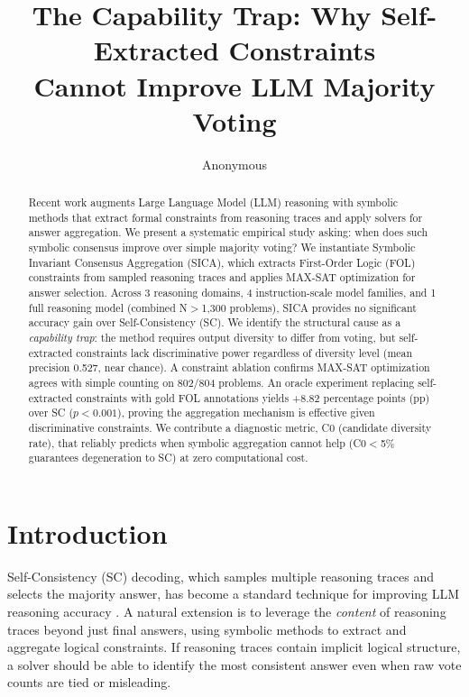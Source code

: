 \documentclass[11pt,a4paper]{article}
\title{The Capability Trap: Why Self-Extracted Constraints\\Cannot Improve LLM Majority Voting}
\author{Anonymous}
\date{}
\begin{document}
\maketitle

\begin{abstract}
Recent work augments Large Language Model (LLM) reasoning with symbolic methods that extract formal constraints from reasoning traces and apply solvers for answer aggregation. We present a systematic empirical study asking: when does such symbolic consensus improve over simple majority voting? We instantiate Symbolic Invariant Consensus Aggregation (SICA), which extracts First-Order Logic (FOL) constraints from sampled reasoning traces and applies MAX-SAT optimization for answer selection. Across 3 reasoning domains, 4 instruction-scale model families, and 1 full reasoning model (combined N$>$1,300 problems), SICA provides no significant accuracy gain over Self-Consistency (SC). We identify the structural cause as a \emph{capability trap}: the method requires output diversity to differ from voting, but self-extracted constraints lack discriminative power regardless of diversity level (mean precision 0.527, near chance). A constraint ablation confirms MAX-SAT optimization agrees with simple counting on 802/804 problems. An oracle experiment replacing self-extracted constraints with gold FOL annotations yields +8.82 percentage points (pp) over SC ($p<0.001$), proving the aggregation mechanism is effective given discriminative constraints. We contribute a diagnostic metric, C0 (candidate diversity rate), that reliably predicts when symbolic aggregation cannot help (C0$<$5\% guarantees degeneration to SC) at zero computational cost.
\end{abstract}

\section{Introduction}

Self-Consistency (SC) decoding, which samples multiple reasoning traces and selects the majority answer, has become a standard technique for improving LLM reasoning accuracy \citep{wang2023selfconsistency}. A natural extension is to leverage the \emph{content} of reasoning traces beyond just final answers, using symbolic methods to extract and aggregate logical constraints. If reasoning traces contain implicit logical structure, a solver should be able to identify the most consistent answer even when raw vote counts are tied or misleading.
\end{document}
